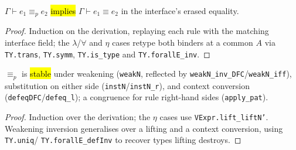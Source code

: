 \begin{lemma}
\label{thm:expb-normaleq-defeq}
\leanok
{}

 $\Gamma\vdash e_1\equiv_p e_2$ \hl{implies} $\Gamma\vdash e_1\equiv e_2$ in the
interface's erased equality.
\end{lemma}
\begin{proof}
\leanok
{} Induction on the derivation, replaying each rule with the matching interface field; the
$\lambda$/$\forall$ and $\eta$ cases retype both binders at a common $A$ via \texttt{TY.trans},
\texttt{TY.symm}, \texttt{TY.is\_type} and \texttt{TY.forallE\_inv}.
\end{proof}

\begin{lemma}
\label{family:expb-normaleq-struct}
\leanok
{}

 $\equiv_p$ is \hl{stable} under weakening (\texttt{weakN}, reflected by
\texttt{weakN\_inv\_DFC}/\texttt{weakN\_iff}), substitution on either side
(\texttt{instN}/\texttt{instN\_r}), and context conversion (\texttt{defeqDFC}/\texttt{defeq\_l}); a
congruence for rule right-hand sides (\texttt{apply\_pat}).
\end{lemma}
\begin{proof}
\leanok
{} Induction over the derivation; the $\eta$ cases use \texttt{VExpr.lift\_liftN'}.
Weakening inversion generalises over a lifting and a context conversion, using \texttt{TY.uniq}/%
\texttt{TY.forallE\_defInv} to recover types lifting destroys.
\end{proof}

